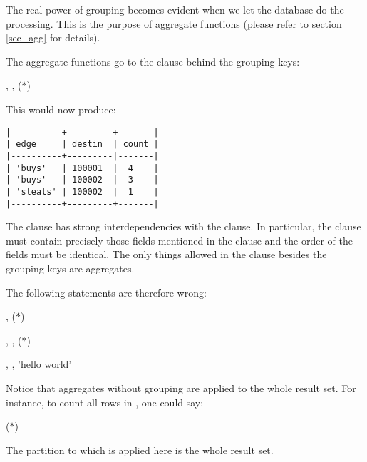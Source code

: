 The real power of grouping becomes evident
when we let the database do the processing.
This is the purpose of aggregate functions
(please refer to section \ref{sec_agg} for details).

The aggregate functions go to the  clause
behind the grouping keys:

 ,
                 ,
                 ($\ast$)
 
 

This would now produce:

\begin{minipage}{\textwidth}
\begin{verbatim}
|----------+---------+-------|
| edge     | destin  | count |
|----------+---------|-------|
| 'buys'   | 100001  |  4    |
| 'buys'   | 100002  |  3    |
| 'steals' | 100002  |  1    |
|----------+---------+-------|
\end{verbatim}
\end{minipage}

The  clause has strong interdependencies
with the  clause.
In particular, the  clause must
contain precisely those fields mentioned in the
 clause and the order of the fields
must be identical. The only things allowed in
the  clause besides the grouping keys
are aggregates.

The following statements are therefore wrong:

 , 
                 ($\ast$)
 
 

 ,
                 , 
                 ($\ast$)
 
 

 , 
                 ,
                 'hello world'
 
 

Notice that aggregates without grouping
are applied to the whole result set.
For instance, to count all rows in ,
one could say:

 ($\ast$)
 

The partition to which  is applied here
is the whole result set.

